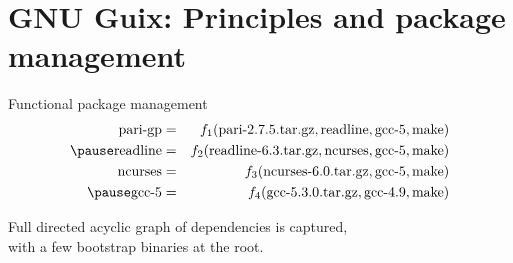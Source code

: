 \documentclass [t]{beamer}
\begin{document}
\section {GNU Guix: Principles and package management}

\begin {frame}{Functional package management}
\begin {eqnarray*}
\text {pari-gp}  & = & f_1 (\text {pari-2.7.5.tar.gz}, \text {readline},
  \text {gcc-5}, \text {make}) \\
\pause
\text {readline} & = & f_2 (\text {readline-6.3.tar.gz}, \text {ncurses},
  \text {gcc-5}, \text {make}) \\
\text {ncurses} & = & f_3 (\text {ncurses-6.0.tar.gz},
  \text {gcc-5}, \text {make}) \\
\pause
\text {gcc-5} & = & f_4 (\text {gcc-5.3.0.tar.gz},
  \text {gcc-4.9}, \text {make})
\end {eqnarray*}

\pause
\vspace {1cm}
Full \textcolor {blau}{directed acyclic graph} of dependencies is captured, \\
with a few \textcolor {rot}{bootstrap binaries} at the root.
\end {frame}
\end{document}
